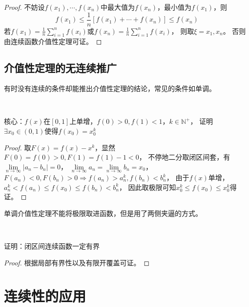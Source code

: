 \begin{proof}
  不妨设$f(x_1),\cdots,f(x_n)$中最大值为$f(x_n)$，最小值为$f(x_1)$，则
  \begin{equation*}
    f(x_1) \leq \frac{1}{n} [f(x_1) + \cdots + f(x_n)] \leq f(x_n)
  \end{equation*}
  若$f(x_1) = \frac{1}{n} \sum\limits_{i = 1}^n f(x_i)$或$f(x_n) = \frac{1}{n} \sum\limits_{i = 1}^n f(x_i)$，
  则取$\xi = x_1, x_n$。
  否则由连续函数介值性定理可证。
\end{proof}

\subsection{介值性定理的无连续推广}

有时没有连续的条件却能推出介值性定理的结论，常见的条件如单调。

~

\begin{exercise}[单调介值定理]
  核心：$f(x)$在$[0,1]$上单增，$f(0) > 0, f(1) < 1$，$k \in \mathbb{N}^+$，
  证明$\exists x_0 \in (0,1)$使得$f(x_0) = x_0^k$
\end{exercise}

\begin{proof}
  取$F(x) = f(x ) - x^k$，显然$F(0) = f(0) > 0, F(1) = f(1) - 1 < 0$，
  不停地二分取闭区间套，有$\lim \limits _{n \rightarrow \infty} |a_n - b_n| = 0$，
  $\lim \limits _{n \rightarrow \infty} a_n = \lim \limits _{n \rightarrow \infty} b_n = x_0$，
  $F(a_n) < 0, F(b_n) > 0 \Rightarrow f(a_n) > a_n^k, f(b_n) < b_n^k$，
  由于$f(x)$单增，$a_n^k < f(a_n) \leq f(x_0) \leq f(b_n) < b_n^k$，
  因此取极限可知$x_0^k \leq f(x_0) \leq x_0^k$得证。
\end{proof}

\begin{note}
  单调介值性定理不能将极限取进函数，但是用了两侧夹逼的方式。
\end{note}

~

\begin{exercise}
  证明：闭区间连续函数一定有界
\end{exercise}

\begin{proof}
  根据局部有界性以及有限开覆盖可证。
\end{proof}


\section{连续性的应用}


